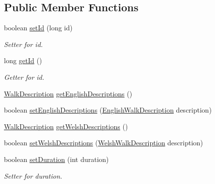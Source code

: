 \subsection*{Public Member Functions}
\begin{DoxyCompactItemize}
\item 
boolean \hyperlink{classuk_1_1ac_1_1swan_1_1digitaltrails_1_1components_1_1_walk_a8420e81579a4a93cd8194c51ed759655}{set\+Id} (long id)
\begin{DoxyCompactList}\small\item\em Setter for id. \end{DoxyCompactList}\item 
long \hyperlink{classuk_1_1ac_1_1swan_1_1digitaltrails_1_1components_1_1_walk_a01491cb2ef01618947ba840f2226e45c}{get\+Id} ()
\begin{DoxyCompactList}\small\item\em Getter for id. \end{DoxyCompactList}\item 
\hyperlink{classuk_1_1ac_1_1swan_1_1digitaltrails_1_1components_1_1_walk_description}{Walk\+Description} \hyperlink{classuk_1_1ac_1_1swan_1_1digitaltrails_1_1components_1_1_walk_a91177b7c934099081bcb3bd30fb4661d}{get\+English\+Descriptions} ()
\item 
boolean \hyperlink{classuk_1_1ac_1_1swan_1_1digitaltrails_1_1components_1_1_walk_a846eeaec775dda6a17c9394e89fa5f4b}{set\+English\+Descriptions} (\hyperlink{classuk_1_1ac_1_1swan_1_1digitaltrails_1_1components_1_1_english_walk_description}{English\+Walk\+Description} description)
\item 
\hyperlink{classuk_1_1ac_1_1swan_1_1digitaltrails_1_1components_1_1_walk_description}{Walk\+Description} \hyperlink{classuk_1_1ac_1_1swan_1_1digitaltrails_1_1components_1_1_walk_ad5fb40f13dcc9398a47dfd3006a98b95}{get\+Welsh\+Descriptions} ()
\item 
boolean \hyperlink{classuk_1_1ac_1_1swan_1_1digitaltrails_1_1components_1_1_walk_a8f35d6cea1989aa3ffc0072c63b7da02}{set\+Welsh\+Descriptions} (\hyperlink{classuk_1_1ac_1_1swan_1_1digitaltrails_1_1components_1_1_welsh_walk_description}{Welsh\+Walk\+Description} description)
\item 
boolean \hyperlink{classuk_1_1ac_1_1swan_1_1digitaltrails_1_1components_1_1_walk_a685bbc650733996587057b8b7b58a2ef}{set\+Duration} (int duration)
\begin{DoxyCompactList}\small\item\em Setter for duration. \end{DoxyCompactList}\item 

\end{DoxyCompactItemize}

